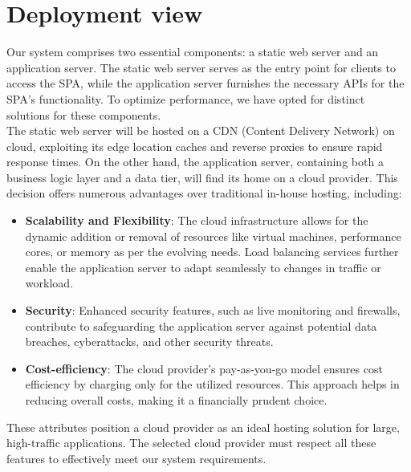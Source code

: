 \section{Deployment view}
Our system comprises two essential components: a static web server and an application server. The static web server serves as the entry point for clients to access the SPA, while the application server furnishes the necessary APIs for the SPA's functionality. To optimize performance, we have opted for distinct solutions for these components.\\
The static web server will be hosted on a CDN (Content Delivery Network) on cloud, exploiting its edge location caches and reverse proxies to ensure rapid response times. On the other hand, the application server, containing both a business logic layer and a data tier, will find its home on a cloud provider. This decision offers numerous advantages over traditional in-house hosting, including:
\begin{itemize}
    \item \textbf{Scalability and Flexibility}: The cloud infrastructure allows for the dynamic addition or removal of resources like virtual machines, performance cores, or memory as per the evolving needs. Load balancing services further enable the application server to adapt seamlessly to changes in traffic or workload.
    \item \textbf{Security}: Enhanced security features, such as live monitoring and firewalls, contribute to safeguarding the application server against potential data breaches, cyberattacks, and other security threats.
    \item \textbf{Cost-efficiency}: The cloud provider's pay-as-you-go model ensures cost efficiency by charging only for the utilized resources. This approach helps in reducing overall costs, making it a financially prudent choice.
\end{itemize}
These attributes position a cloud provider as an ideal hosting solution for large, high-traffic applications. The selected cloud provider must respect all these features to effectively meet our system requirements.\\
